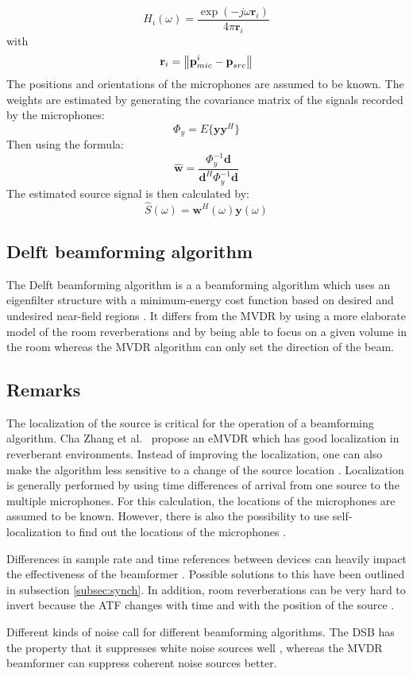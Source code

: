 \[
H_{i}(\omega) = \frac{\exp(-j\omega \textbf{r}_{i})}{4\pi \textbf{r}_{i}}
\]
with
\[
\textbf{r}_{i} = \left\lVert\textbf{p}_{mic}^{i}-\textbf{p}_{src}\right\rVert
\]
The positions and orientations of the microphones are assumed to be known. The weights are estimated by generating the covariance matrix of the signals recorded by the microphones:
\[
\Phi_{y} = E\{\textbf{y}\textbf{y}^{H}\}
\]
Then using the formula:
\[
\hat{\textbf{w}} = \frac{\Phi_{y}^{-1}\textbf{d}}{\textbf{d}^{H}\Phi_{y}^{-1}\textbf{d}}
\]
The estimated source signal is then calculated by:
\[
\hat{S}(\omega) = \textbf{w}^{H}(\omega)\textbf{y}(\omega)
\]

\subsection{Delft beamforming algorithm}
The Delft beamforming algorithm is a a beamforming algorithm which uses an eigenfilter structure with a minimum-energy cost function based on desired and undesired near-field regions \cite{martinez2015}. It differs from the MVDR by using a more elaborate model of the room reverberations and by being able to focus on a given volume in the room whereas the MVDR algorithm can only set the direction of the beam.

\subsection{Remarks}
The localization of the source is critical for the operation of a beamforming algorithm. Cha Zhang et al.\ \cite{zhang2008} propose an eMVDR which has good localization in reverberant environments. Instead of improving the localization, one can also make the algorithm less sensitive to a change of the source location \cite{ehrenberg2010}. Localization is generally performed by using time differences of arrival from one source to the multiple microphones. For this calculation, the locations of the microphones are assumed to be known. However, there is also the possibility to use self-localization to find out the locations of the microphones \cite{hennecke2011}.

Differences in sample rate and time references between devices can heavily impact the effectiveness of the beamformer \cite{schm2013}. Possible solutions to this have been outlined in subsection \ref{subsec:synch}. In addition, room reverberations can be very hard to invert because the ATF changes with time and with the position of the source \cite{jin2010}.

Different kinds of noise call for different beamforming algorithms. The DSB has the property that it suppresses white noise sources well \cite{brandstein2001}, whereas the MVDR beamformer can suppress coherent noise sources \cite{naylor2010speech} better.